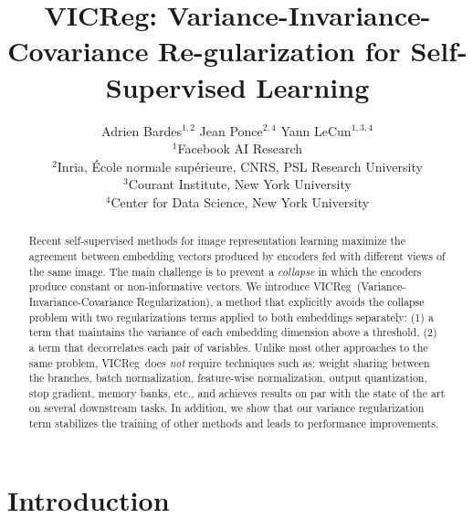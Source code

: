\documentclass{article} %
\title{VICReg: Variance-Invariance-Covariance
Re-gularization for Self-Supervised Learning}
\author{
    Adrien Bardes$^{1,2}$ \And Jean Ponce$^{2,4}$ \And Yann LeCun$^{1,3,4}$ \AND
    \begin{tabular}{l}
        $^1$\normalfont Facebook AI Research\\
        $^2$\normalfont Inria, École normale supérieure, CNRS, PSL Research University \\
        $^3$\normalfont Courant Institute, New York University\\
        $^4$\normalfont Center for Data Science, New York University\\
    \end{tabular}
}
\newcommand{\algo}{VICReg}
\begin{document}
\maketitle

\begin{abstract}
Recent self-supervised methods for image representation learning maximize the agreement between embedding vectors produced by encoders fed with different views of the same image. The main challenge is to prevent a {\em collapse} in which the encoders produce constant or non-informative vectors. We introduce \algo \ (Variance-Invariance-Covariance Regularization), a method that explicitly avoids the collapse problem with two regularizations terms applied to both embeddings separately: (1) a term that maintains the variance of each embedding dimension above a threshold, (2) a term that decorrelates each pair of variables. Unlike most other approaches to the same problem, \algo \ does {\em not} require techniques such as: weight sharing between the branches, batch normalization, feature-wise normalization, output quantization, stop gradient, memory banks, etc., and achieves results on par with the state of the art on several downstream tasks. In addition, we show that our variance regularization term stabilizes the training of other methods and leads to performance improvements.
\end{abstract}

\newcommand\blfootnote[1]{%
  \begingroup
  \renewcommand\thefootnote{}\footnotetext{#1}%
  \endgroup
}

\section{Introduction}
\end{document}
